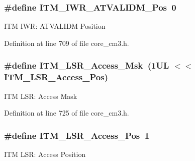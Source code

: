 \subsubsection[{\texorpdfstring{I\+T\+M\+\_\+\+I\+W\+R\+\_\+\+A\+T\+V\+A\+L\+I\+D\+M\+\_\+\+Pos}{ITM_IWR_ATVALIDM_Pos}}]{\setlength{\rightskip}{0pt plus 5cm}\#define I\+T\+M\+\_\+\+I\+W\+R\+\_\+\+A\+T\+V\+A\+L\+I\+D\+M\+\_\+\+Pos~0}\hypertarget{group__CMSIS__ITM_ga04d3f842ad48f6a9127b4cecc963e1d7}{}\label{group__CMSIS__ITM_ga04d3f842ad48f6a9127b4cecc963e1d7}
I\+TM I\+WR\+: A\+T\+V\+A\+L\+I\+DM Position 

Definition at line 709 of file core\+\_\+cm3.\+h.

\subsubsection[{\texorpdfstring{I\+T\+M\+\_\+\+L\+S\+R\+\_\+\+Access\+\_\+\+Msk}{ITM_LSR_Access_Msk}}]{\setlength{\rightskip}{0pt plus 5cm}\#define I\+T\+M\+\_\+\+L\+S\+R\+\_\+\+Access\+\_\+\+Msk~(1\+U\+L $<$$<$ I\+T\+M\+\_\+\+L\+S\+R\+\_\+\+Access\+\_\+\+Pos)}\hypertarget{group__CMSIS__ITM_gac8ae69f11c0311da226c0c8ec40b3d37}{}\label{group__CMSIS__ITM_gac8ae69f11c0311da226c0c8ec40b3d37}
I\+TM L\+SR\+: Access Mask 

Definition at line 725 of file core\+\_\+cm3.\+h.

\subsubsection[{\texorpdfstring{I\+T\+M\+\_\+\+L\+S\+R\+\_\+\+Access\+\_\+\+Pos}{ITM_LSR_Access_Pos}}]{\setlength{\rightskip}{0pt plus 5cm}\#define I\+T\+M\+\_\+\+L\+S\+R\+\_\+\+Access\+\_\+\+Pos~1}\hypertarget{group__CMSIS__ITM_ga144a49e12b83ad9809fdd2769094fdc0}{}\label{group__CMSIS__ITM_ga144a49e12b83ad9809fdd2769094fdc0}
I\+TM L\+SR\+: Access Position 

